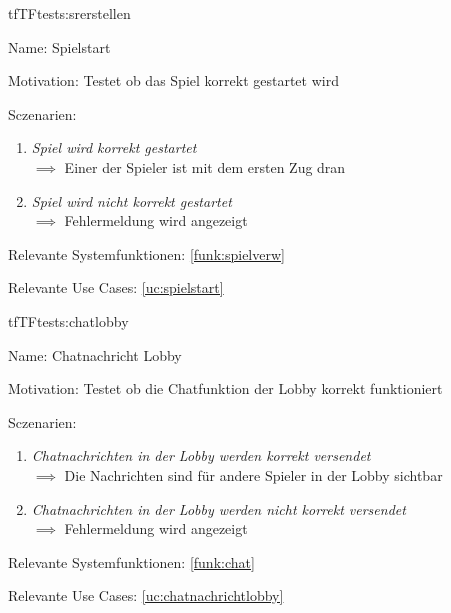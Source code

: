 \begin{description}[leftmargin=5em, style=sameline]

\begin{lhp}{tf}{TF}{tests:srerstellen}
	\item [Name:] Spielstart
	\item [Motivation:] Testet ob das Spiel korrekt gestartet wird
	\item [Sczenarien:] \hfill
		\begin{enumerate}
			\item \textit{Spiel wird korrekt gestartet } \\ $\implies$ Einer der Spieler ist mit dem ersten Zug dran
			
			\item \textit{Spiel wird nicht korrekt gestartet } \\ $\implies$ Fehlermeldung wird angezeigt
			
			
		\end{enumerate}
	\item [Relevante Systemfunktionen:] \ref{funk:spielverw}
	\item [Relevante Use Cases:] \ref{uc:spielstart}
\end{lhp}

\end{description}






\begin{description}[leftmargin=5em, style=sameline]

\begin{lhp}{tf}{TF}{tests:chatlobby}
	\item [Name:] Chatnachricht Lobby
	\item [Motivation:] Testet ob die Chatfunktion der Lobby korrekt funktioniert
	\item [Sczenarien:] \hfill
		\begin{enumerate}
			\item \textit{ Chatnachrichten in der Lobby werden korrekt versendet} \\ $\implies$ Die Nachrichten sind für andere Spieler in der Lobby sichtbar
			
			\item \textit{Chatnachrichten in der Lobby werden nicht korrekt versendet } \\ $\implies$ Fehlermeldung wird angezeigt
			
		\end{enumerate}
	\item [Relevante Systemfunktionen:] \ref{funk:chat}
	\item [Relevante Use Cases:] \ref{uc:chatnachrichtlobby}
\end{lhp}

\end{description}






